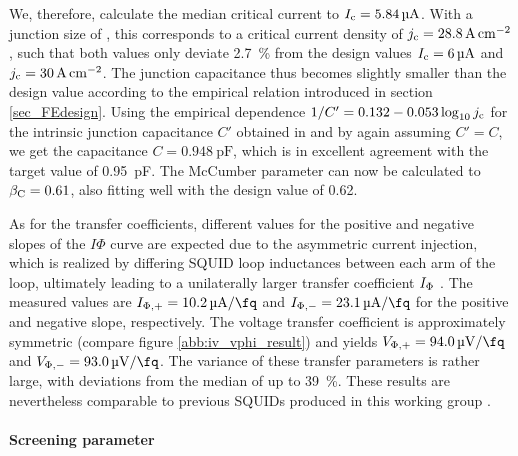 
We, therefore, calculate the median critical current to $I_{\rm c}=\qty{5.84}{\micro\ampere}$. With a junction size of , this corresponds to a critical current density of $j_{\rm c}=\qty{28.8}{\ampere\per\centi\meter\squared}$, such that both values only deviate \qty{2.7}{\percent} from the design values $I_{\rm c}=\qty{6}{\micro\ampere}$ and $j_{\rm c}=\qty{30}{\ampere\per\centi\meter\squared}$. The junction capacitance thus becomes slightly smaller than the design value according to the empirical relation introduced in section \ref{sec_FEdesign}. Using the empirical dependence $1/C'=0.132-0.053\log_{10}j_{\rm c}$ for the intrinsic junction capacitance $C'$ obtained in \cite{Bauer2022} and by again assuming $C'=C$, we get the capacitance $C=\qty{0.948}{\pico\farad}$, which is in excellent agreement with the target value of \qty{0.95}{\pico\farad}. The McCumber parameter can now be calculated to $\beta_{\rm C}=0.61$, also fitting well with the design value of 0.62. 

As for the transfer coefficients, different values for the positive and negative slopes of the $I\Phi$ curve are expected due to the asymmetric current injection, which is realized by differing SQUID loop inductances between each arm of the loop, ultimately leading to a unilaterally larger transfer coefficient $I_{\rm \Phi}$ \cite{Ferring2015}. The measured values are $I_{\rm \Phi,+}=\qty{10.2}{\micro\ampere\per\fq}$ and $I_{\rm \Phi,-}=\qty{23.1}{\micro\ampere\per\fq}$ for the positive and negative slope, respectively. The voltage transfer coefficient is approximately symmetric (compare figure \ref{abb:iv_vphi_result}) and yields $V_{\rm \Phi,+}=\qty{94.0}{\micro\volt\per\fq}$ and $V_{\rm \Phi,-}=\qty{93.0}{\micro\volt\per\fq}$. The variance of these transfer parameters is rather large, with deviations from the median of up to \qty{39}{\percent}. These results are nevertheless comparable to previous SQUIDs produced in this working group \cite{Richter2017}.  

\paragraph{Screening parameter }

